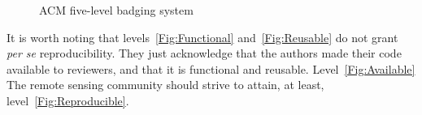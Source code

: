 \documentclass[journal,twopage]{IEEEtran}
\begin{document}
\begin{figure}[hbt]
\centering
{}
\caption{ACM five-level badging system}\label{fig:ACM-Badging}
\end{figure}

It is worth noting that levels~\ref{Fig:Functional} and~\ref{Fig:Reusable} do not grant \textit{per se} reproducibility.
They just acknowledge that the authors made their code available to reviewers, and that it is functional and reusable.
Level~\ref{Fig:Available} 
The remote sensing community should strive to attain, at least, level~\ref{Fig:Reproducible}.
\end{document}
